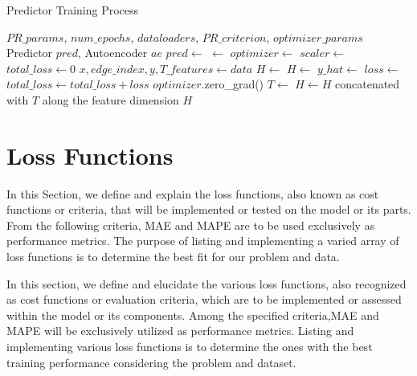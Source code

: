 \begin{algorithm}
\caption{Predictor Training Process}
\label{alg:pred}
\begin{algorithmic}[1]
\Require $PR\_params$, $num\_epochs$, $dataloaders$, $PR\_criterion$, $optimizer\_params$
\Ensure Predictor $pred$, Autoencoder $ae$
\State $pred \gets$ 
\State  {} $ \gets$ 
\State $optimizer \gets$ 
\State $scaler \gets$ 
        \State $total\_loss \gets 0$
            \State $x, edge\_index, y, T\_features \gets data$
            \State $H \gets$ 
            \State $H \gets$ 
            \State $y\_hat \gets$ 
            \State $loss \gets$ 
            \State $total\_loss \gets total\_loss + loss$
        \EndFor
        \State {}
        \State {}
        \State {}
        \State $optimizer$.zero\_grad()
    \EndFor
\EndFor
{}
    \State $T \gets$ 
    \State $H \gets H$ concatenated with $T$ along the feature dimension
    \State \Return $H$
\EndFunction
\end{algorithmic}
\end{algorithm}

\section{Loss Functions} \label{sec:loss_func}

In this Section, we define and explain the loss functions, also known as cost functions or criteria, that will be implemented or tested on the model or its parts. From the following criteria, \gls{MAE} and \gls{MAPE} are to be used exclusively as performance metrics. The purpose of listing and implementing a varied array of loss functions is to determine the best fit for our problem and data.

In this section, we define and elucidate the various loss functions, also recognized as cost functions or evaluation criteria, which are to be implemented or assessed within the model or its components. Among the specified criteria,\gls{MAE} and \gls{MAPE} will be exclusively utilized as performance metrics. Listing and implementing various loss functions is to determine the ones with the best training performance considering the problem and dataset.

